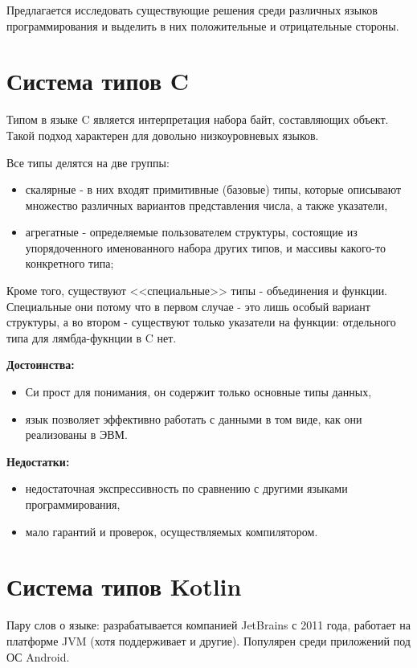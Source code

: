 Предлагается исследовать существующие решения среди различных языков программирования и выделить в них положительные и отрицательные стороны.

\section{Система типов C}
\label{sec:c_type_system}

Типом в языке C является интерпретация набора байт, составляющих объект.
Такой подход характерен для довольно низкоуровневых языков.

Все типы делятся на две группы:
\begin{itemize}
    \item скалярные - в них входят примитивные (базовые) типы, которые описывают множество различных вариантов представления числа, а также указатели,
    \item агрегатные - определяемые пользователем структуры, состоящие из упорядоченного именованного набора других типов, и массивы какого-то конкретного типа;
\end{itemize}

Кроме того, существуют <<специальные>> типы - объединения и функции.
Специальные они потому что в первом случае - это лишь особый вариант структуры, а во втором - существуют только указатели на функции: отдельного типа для лямбда-фукнции в C нет.

\textbf{Достоинства:}
\begin{itemize}
    \item Си прост для понимания, он содержит только основные типы данных,
    \item язык позволяет эффективно работать с данными в том виде, как они реализованы в ЭВМ.
\end{itemize}

\textbf{Недостатки:}
\begin{itemize}
    \item недостаточная экспрессивность по сравнению с другими языками программирования,
    \item мало гарантий и проверок, осуществляемых компилятором.
\end{itemize}

\section{Система типов Kotlin}
\label{sec:kotlin_type_system}

Пару слов о языке: разрабатывается компанией JetBrains с 2011 года, работает на платформе \gls{JVM} (хотя поддерживает и другие).
Популярен среди приложений под ОС Android\cite{KotlinTypeSpec}.

